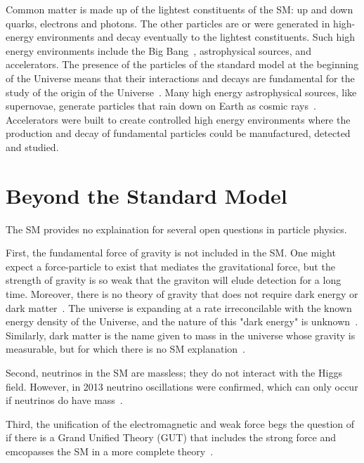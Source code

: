 Common matter is made up of the lightest constituents of the SM: up and down quarks, electrons and photons. The other particles are or were generated in high-energy environments and decay eventually to the lightest constituents. Such high energy environments include the Big Bang~\cite{carroll_introduction_2007}, astrophysical sources, and accelerators. The presence of the particles of the standard model at the beginning of the Universe means that their interactions and decays are fundamental for the study of the origin of the Universe~\cite{carroll_introduction_2007}. Many high energy astrophysical sources, like supernovae, generate particles that rain down on Earth as cosmic rays~\cite{boezio_chemical_2012}. Accelerators were built to create controlled high energy environments where the production and decay of fundamental particles could be manufactured, detected and studied.

\section{Beyond the Standard Model}

The SM provides no explaination for several open questions in particle physics.

First, the fundamental force of gravity is not included in the SM. One might expect a force-particle to exist that mediates the gravitational force, but the strength of gravity is so weak that the graviton will elude detection for a long time. Moreover, there is no theory of gravity that does not require dark energy or dark matter~\cite{zyla_review_2020}. The universe is expanding at a rate irreconcilable with the known energy density of the Universe, and the nature of this "dark energy" is unknown~\cite{carroll_introduction_2007}. Similarly, dark matter is the name given to mass in the universe whose gravity is measurable, but for which there is no SM explanation~\cite{munoz_dark_2004}.

Second, neutrinos in the SM are massless; they do not interact with the Higgs field. However, in 2013 neutrino oscillations were confirmed, which can only occur if neutrinos do have mass~\cite{aharmim_combined_2013}.

Third, the unification of the electromagnetic and weak force begs the question of if there is a Grand Unified Theory (GUT) that includes the strong force and emcopasses the SM in a more complete theory~\cite{georgi_unity_1974}. 

